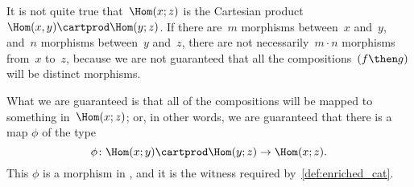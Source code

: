 {\begin{example}
		It is not quite true that~$\Hom(x; z)$ is the Cartesian product~$\Hom(x, y) \cartprod \Hom(y; z)$.
		If there are~$m$ morphisms between~$x$ and~$y$, and~$n$ morphisms between~$y$ and~$z$, there are not necessarily~$m \cdot n$ morphisms from~$x$ to~$z$, because we are not guaranteed that all the compositions~$(f\then g)$ will be distinct morphisms.

		What we are guaranteed is that all of the compositions will be mapped to something in~$\Hom(x; z)$; or, in other words, we are guaranteed that there is a map $\phi$ of the type
		\begin{equation*}
			\phi \colon \Hom(x; y) \cartprod \Hom(y; z) \rightarrow \Hom(x; z).
		\end{equation*}
		This $\phi$ is a morphism in \Set, and it is the witness required by~\cref{def:enriched_cat}.

	\end{example}
}

